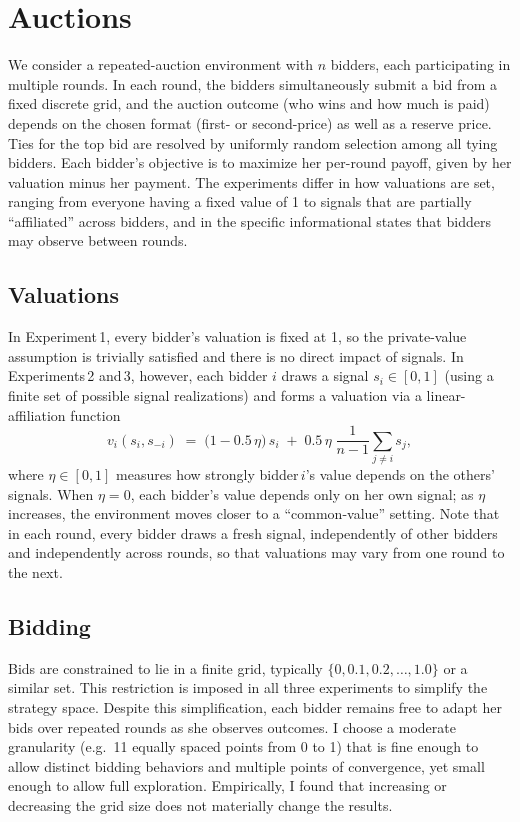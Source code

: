 \section{Auctions}
\label{sec:auctions}

We consider a repeated-auction environment with $n$ bidders, each participating in multiple rounds. In each round, the bidders simultaneously submit a bid from a fixed discrete grid, and the auction outcome (who wins and how much is paid) depends on the chosen format (first- or second-price) as well as a reserve price. Ties for the top bid are resolved by uniformly random selection among all tying bidders. Each bidder's objective is to maximize her per-round payoff, given by her valuation minus her payment. The experiments differ in how valuations are set, ranging from everyone having a fixed value of 1 to signals that are partially ``affiliated'' across bidders, and in the specific informational states that bidders may observe between rounds.

\subsection{Valuations}

In Experiment\,1, every bidder's valuation is fixed at 1, so the private-value assumption is trivially satisfied and there is no direct impact of signals. In Experiments\,2 and\,3, however, each bidder $i$ draws a signal $s_{i}\in [0,1]$ (using a finite set of possible signal realizations) and forms a valuation via a linear-affiliation function
\[
v_{i}(s_{i}, s_{-i}) \;=\; \bigl(1 - 0.5\,\eta\bigr)\,s_{i} \;+\; 0.5\,\eta\;\frac{1}{n-1}\sum_{j\neq i} s_{j},
\]
where $\eta\in[0,1]$ measures how strongly bidder\,$i$'s value depends on the others' signals. When $\eta=0$, each bidder's value depends only on her own signal; as $\eta$ increases, the environment moves closer to a ``common-value'' setting. Note that in each round, every bidder draws a fresh signal, independently of other bidders and independently across rounds, so that valuations may vary from one round to the next.

\subsection{Bidding}

Bids are constrained to lie in a finite grid, typically $\{0,0.1,0.2,\ldots,1.0\}$ or a similar set. This restriction is imposed in all three experiments to simplify the strategy space. Despite this simplification, each bidder remains free to adapt her bids over repeated rounds as she observes outcomes. I choose a moderate granularity (e.g.\ 11 equally spaced points from 0 to 1) that is fine enough to allow distinct bidding behaviors and multiple points of convergence, yet small enough to allow full exploration. Empirically, I found that increasing or decreasing the grid size does not materially change the results.

